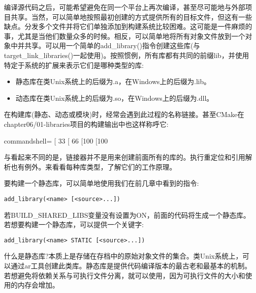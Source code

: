 
编译源代码之后，可能希望避免在同一个平台上再次编译，甚至尽可能地与外部项目共享。当然，可以简单地按照最初创建的方式提供所有的目标文件，但这有一些缺点。分发多个文件并将它们单独添加到构建系统比较困难。这可能是一件麻烦的事，尤其是当他们数量众多的时候。相反，可以简单地将所有对象文件放到一个对象中并共享。可以用一个简单的add\_library()指令创建这些库(与target\_link\_libraries()一起使用)。按照惯例，所有库都有共同的前缀lib，并使用特定于系统的扩展来表示它们是哪种类型的库:

\begin{itemize}
\item 
静态库在类Unix系统上的后缀为.a，在Windows上的后缀为.lib。

\item 
动态库在类Unix系统上的后缀为.so，在Windows上的后缀为.dll。
\end{itemize}

在构建库(静态、动态或模块)时，经常会遇到此过程的名称链接。甚至CMake在chapter06/01-libraries项目的构建输出中也这样称呼它:

\begin{tcblisting}{commandshell={}}
[ 33%
[ 66%
[100%
[100%
\end{tcblisting}

与看起来不同的是，链接器并不是用来创建前面所有的库的。执行重定位和引用解析也有例外。来看看每种库类型，了解它们的工作原理。


要构建一个静态库，可以简单地使用我们在前几章中看到的指令:

\begin{lstlisting}[style=styleCMake]
add_library(<name> [<source>...])
\end{lstlisting}

若BUILD\_SHARED\_LIBS变量没有设置为ON，前面的代码将生成一个静态库。若想要构建一个静态库，可以提供一个关键字:

\begin{lstlisting}[style=styleCMake]
add_library(<name> STATIC [<source>...])
\end{lstlisting}

什么是静态库?本质上是存储在存档中的原始对象文件的集合。类Unix系统上，可以通过ar工具创建此类库。静态库是提供代码编译版本的最古老和最基本的机制。若想避免将依赖关系与可执行文件分离，就可以使用，因为可执行文件的大小和使用的内存会增加。

